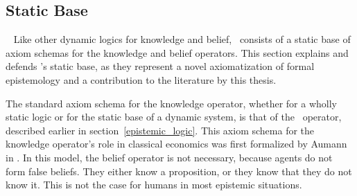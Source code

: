 \subsection{Static Base}~\label{static}
Like other dynamic logics for knowledge and belief, \DASL\ consists of a static base of axiom schemas for the knowledge and belief operators. This section explains and defends \DASL's static base, as they represent a novel axiomatization of formal epistemology and a contribution to the literature by this thesis. 

The standard axiom schema for the knowledge operator, whether for a wholly static logic or for the static base of a dynamic system, is that of the \SFive\ operator, described earlier in section~\ref{epistemic_logic}. This axiom schema for the knowledge operator's role in classical economics was first formalized by Aumann in \cite{Aumann}. In this model, the belief operator is not necessary, because agents do not form false beliefs. They either know a proposition, or they know that they do not know it. This is not the case for humans in most epistemic situations.

%
%
%

